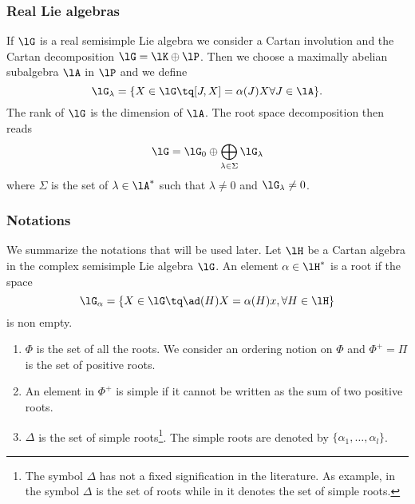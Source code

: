 \subsubsection{Real Lie algebras}

If \( \lG\) is a real semisimple Lie algebra we consider a Cartan involution and the Cartan decomposition \( \lG=\lK\oplus\lP\). Then we choose a maximally abelian subalgebra \( \lA\) in \( \lP\) and we define
\begin{equation}
    \lG_{\lambda}=\{ X\in\lG\tq [J,X]=\alpha(J)X \forall J\in\lA \}.
\end{equation}
The rank of \( \lG\) is the dimension of \( \lA\). The root space decomposition then reads
\begin{equation}
    \lG=\lG_0\oplus\bigoplus_{\lambda\in\Sigma}\lG_{\lambda}
\end{equation}
where \( \Sigma\) is the set of \( \lambda\in\lA^*\) such that \( \lambda\neq 0\) and \( \lG_{\lambda}\neq 0\).

\subsubsection{Notations}
\label{SubsecNotationRootsDel}

We summarize the notations that will be used later. Let \( \lH\) be a Cartan algebra in the complex semisimple Lie algebra \( \lG\). An element \( \alpha\in\lH^*\) is a root if the space
\begin{equation}
    \lG_{\alpha}=\{ X\in\lG\tq \ad(H)X=\alpha(H)x,\forall H\in\lH \}
\end{equation}
is non empty.

\begin{enumerate}
    \item
        \( \Phi\) is the set of all the roots. We consider an ordering notion on \( \Phi\) and \( \Phi^+=\Pi\) is the set of positive roots.
    \item
        An element in \( \Phi^+\) is simple if it cannot be written as the sum of two positive roots.
    \item
        \( \Delta\) is the set of simple roots\footnote{The symbol \( \Delta\) has not a fixed signification in the literature. As example, in \cite{Cornwell} the symbol \( \Delta\) is the set of roots while in \cite{SternLieAlgebra} it denotes the set of simple roots.}. The simple roots are denoted by \( \{ \alpha_1,\ldots,\alpha_l \}\).
\end{enumerate}

